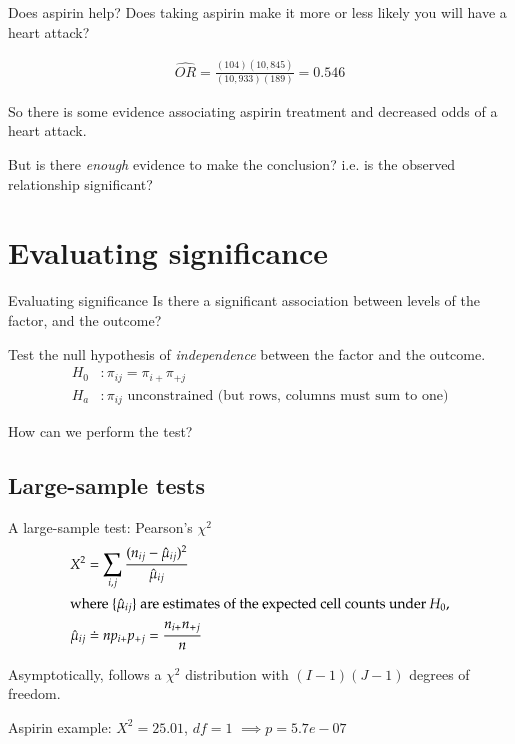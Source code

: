 \documentclass[serif,mathserif,professionalfonts]{beamer}
\begin{document}
\begin{frame}{Does aspirin help?}
  Does taking aspirin make it more or less likely you will have a
  heart attack?

  \begin{align*}
    \widehat{OR} = \frac{(104)(10,845)}{(10,933)(189)}=0.546
  \end{align*}

  So there is some evidence associating aspirin treatment and
  decreased odds of a heart attack.

  But is there \emph{enough} evidence to make the conclusion?  i.e. is the
  observed relationship significant?

\end{frame}



\section{Evaluating significance}
\begin{frame}{Evaluating significance}
  Is there a significant association between levels of the factor, and
  the outcome?
  
  Test the null hypothesis of \emph{independence} between the factor
  and the outcome. 
\begin{align*}
  H_0&: \pi_{ij} = \pi_{i+} \pi_{+j} \\
  H_a&: \pi_{ij} \text{ unconstrained (but rows, columns must sum to one)}
\end{align*}

How can we perform the test?
\end{frame}

\subsection{Large-sample tests}

\begin{frame}{A large-sample test: Pearson's $\chi^2$}
  \begin{align*}
  X^2 & = \sum_{i,j} \frac{(n_{ij}-\hat{\mu}_{ij})^2}{\hat{\mu}_{ij}} \\
\intertext{where $\{\hat{\mu}_{ij}\}$ are estimates of the expected
          cell counts under $H_0$,} 
  \hat{\mu}_{ij} & \doteq  n p_{i+} p_{+j} = \frac{n_{i+}n_{+j}}{n}
  \end{align*}

  Asymptotically, follows a $\chi^2$ distribution with $(I-1)(J-1)$
  degrees of freedom.

  Aspirin example: $X^2=25.01$, $df=1$ $\implies p=5.7e-07$

\end{frame}
\end{document}
